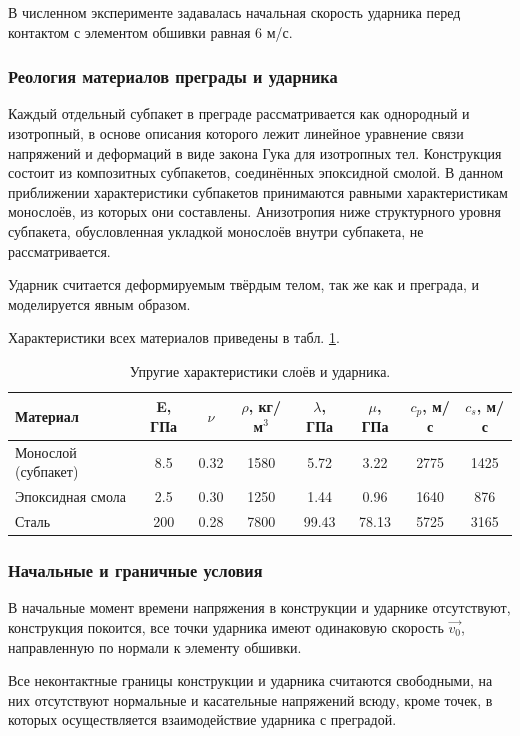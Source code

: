 В численном эксперименте задавалась начальная скорость ударника перед контактом с элементом обшивки равная 6 м/с.

\subsubsection*{Реология материалов преграды и ударника}

Каждый отдельный субпакет в преграде рассматривается как однородный и изотропный, в основе описания которого лежит линейное уравнение связи напряжений и деформаций в виде закона Гука для изотропных тел. Конструкция состоит из композитных субпакетов, соединённых эпоксидной смолой. В данном приближении характеристики субпакетов принимаются равными характеристикам монослоёв, из которых они составлены. Анизотропия ниже структурного уровня субпакета, обусловленная укладкой монослоёв внутри субпакета, не рассматривается.

Ударник считается деформируемым твёрдым телом, так же как и преграда, и моделируется явным образом.

Характеристики всех материалов приведены в табл. \ref{tbl:subpackage}.

\begin{table}[h]
\centering
\begin{tabular}{|p{3cm}|c|c|c|c|c|c|c|}
\hline
Материал & E, ГПа & $\nu$ & $\rho$, кг/м$^{3}$ & $\lambda$, ГПа & $\mu$, ГПа &
$c_p$, м/с & $c_s$, м/с \\
\hline
Монослой (субпакет) & 8.5 & 0.32 & 1580 & 5.72 & 3.22 & 2775 & 1425 \\
Эпоксидная смола & 2.5 & 0.30 & 1250 & 1.44 & 0.96 & 1640 & 876 \\
Сталь & 200 & 0.28 & 7800 & 99.43 & 78.13 & 5725 & 3165 \\
\hline
\end{tabular}
\caption{Упругие характеристики слоёв и ударника.}
\label{tbl:subpackage}
\end{table}

\subsubsection*{Начальные и граничные условия}

В начальные момент времени напряжения в конструкции и ударнике отсутствуют, конструкция покоится, все точки ударника имеют одинаковую скорость $\vec{v_0}$, направленную по нормали к элементу обшивки.

Все неконтактные границы конструкции и ударника считаются свободными, на них отсутствуют нормальные и касательные напряжений всюду, кроме точек, в которых осуществляется взаимодействие ударника с преградой.

